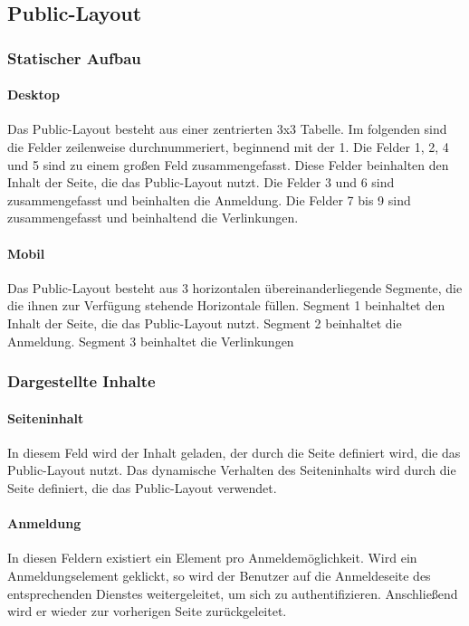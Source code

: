 \subsection{Public-Layout}

\subsubsection{Statischer Aufbau}
\paragraph*{Desktop}
Das Public-Layout besteht aus einer zentrierten 3x3 Tabelle.
Im folgenden sind die Felder zeilenweise durchnummeriert, beginnend mit der 1.
Die Felder 1, 2, 4 und 5 sind zu einem großen Feld zusammengefasst. Diese Felder beinhalten den Inhalt der Seite, die das Public-Layout nutzt. 
Die Felder 3 und 6 sind zusammengefasst und beinhalten die Anmeldung.
Die Felder 7 bis 9 sind zusammengefasst und beinhaltend die Verlinkungen.

\paragraph*{Mobil}
Das Public-Layout besteht aus 3 horizontalen übereinanderliegende Segmente, die die ihnen zur Verfügung stehende Horizontale füllen.
Segment 1 beinhaltet den Inhalt der Seite, die das Public-Layout nutzt. 
Segment 2 beinhaltet die Anmeldung.
Segment 3 beinhaltet die Verlinkungen

\subsubsection{Dargestellte Inhalte}
\paragraph*{Seiteninhalt}
In diesem Feld wird der Inhalt geladen, der durch die Seite definiert wird, die das Public-Layout nutzt.
Das dynamische Verhalten des Seiteninhalts wird durch die Seite definiert, die das Public-Layout verwendet.

\paragraph*{Anmeldung}
In diesen Feldern existiert ein Element pro Anmeldemöglichkeit.
Wird ein Anmeldungselement geklickt, so wird der Benutzer auf die Anmeldeseite des entsprechenden Dienstes weitergeleitet, um sich zu authentifizieren.
Anschließend wird er wieder zur vorherigen Seite zurückgeleitet.

